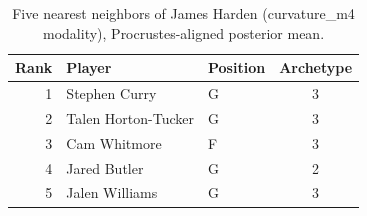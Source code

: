\begin{table}[htbp]
  \centering\small
  \begin{tabular}{rllc}
    \toprule
    Rank & Player & Position & Archetype \\
    \midrule
    1 & Stephen Curry & G & 3 \\
    2 & Talen Horton-Tucker & G & 3 \\
    3 & Cam Whitmore & F & 3 \\
    4 & Jared Butler & G & 2 \\
    5 & Jalen Williams & G & 3 \\
    \bottomrule
  \end{tabular}
  \caption{Five nearest neighbors of James Harden (curvature_m4 modality), Procrustes-aligned posterior mean.}
  \label{tab:James_Harden_neighbors_curvature_m4}
\end{table}

